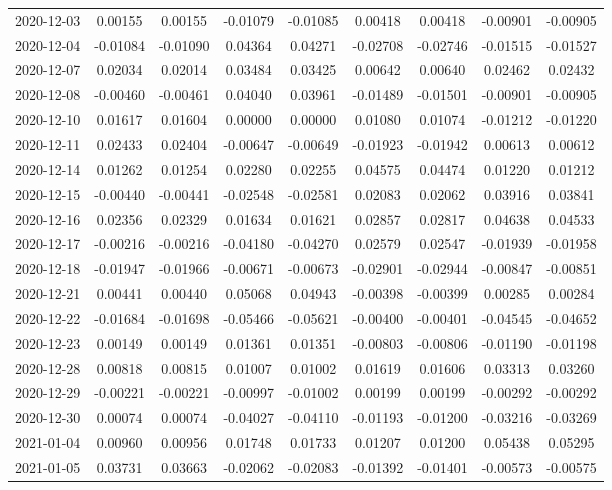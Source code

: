 \begin{footnotesize}
\begin{longtable}{lcccccccc}
2020-12-03 & 0.00155 & 0.00155 & -0.01079 & -0.01085 & 0.00418 & 0.00418 & -0.00901 & -0.00905 \\
2020-12-04 & -0.01084 & -0.01090 & 0.04364 & 0.04271 & -0.02708 & -0.02746 & -0.01515 & -0.01527 \\
2020-12-07 & 0.02034 & 0.02014 & 0.03484 & 0.03425 & 0.00642 & 0.00640 & 0.02462 & 0.02432 \\
2020-12-08 & -0.00460 & -0.00461 & 0.04040 & 0.03961 & -0.01489 & -0.01501 & -0.00901 & -0.00905 \\
2020-12-10 & 0.01617 & 0.01604 & 0.00000 & 0.00000 & 0.01080 & 0.01074 & -0.01212 & -0.01220 \\
2020-12-11 & 0.02433 & 0.02404 & -0.00647 & -0.00649 & -0.01923 & -0.01942 & 0.00613 & 0.00612 \\
2020-12-14 & 0.01262 & 0.01254 & 0.02280 & 0.02255 & 0.04575 & 0.04474 & 0.01220 & 0.01212 \\
2020-12-15 & -0.00440 & -0.00441 & -0.02548 & -0.02581 & 0.02083 & 0.02062 & 0.03916 & 0.03841 \\
2020-12-16 & 0.02356 & 0.02329 & 0.01634 & 0.01621 & 0.02857 & 0.02817 & 0.04638 & 0.04533 \\
2020-12-17 & -0.00216 & -0.00216 & -0.04180 & -0.04270 & 0.02579 & 0.02547 & -0.01939 & -0.01958 \\
2020-12-18 & -0.01947 & -0.01966 & -0.00671 & -0.00673 & -0.02901 & -0.02944 & -0.00847 & -0.00851 \\
2020-12-21 & 0.00441 & 0.00440 & 0.05068 & 0.04943 & -0.00398 & -0.00399 & 0.00285 & 0.00284 \\
2020-12-22 & -0.01684 & -0.01698 & -0.05466 & -0.05621 & -0.00400 & -0.00401 & -0.04545 & -0.04652 \\
2020-12-23 & 0.00149 & 0.00149 & 0.01361 & 0.01351 & -0.00803 & -0.00806 & -0.01190 & -0.01198 \\
2020-12-28 & 0.00818 & 0.00815 & 0.01007 & 0.01002 & 0.01619 & 0.01606 & 0.03313 & 0.03260 \\
2020-12-29 & -0.00221 & -0.00221 & -0.00997 & -0.01002 & 0.00199 & 0.00199 & -0.00292 & -0.00292 \\
2020-12-30 & 0.00074 & 0.00074 & -0.04027 & -0.04110 & -0.01193 & -0.01200 & -0.03216 & -0.03269 \\
2021-01-04 & 0.00960 & 0.00956 & 0.01748 & 0.01733 & 0.01207 & 0.01200 & 0.05438 & 0.05295 \\
2021-01-05 & 0.03731 & 0.03663 & -0.02062 & -0.02083 & -0.01392 & -0.01401 & -0.00573 & -0.00575 \\

\end{longtable}
\end{footnotesize}
